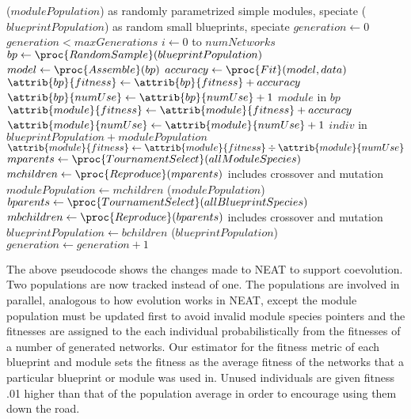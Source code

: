 \documentclass[11pt]{article}
\begin{document}
\begin{codebox}
\li {}($modulePopulation$) \>\>\>\>\>\>\>\>\Comment as randomly parametrized simple modules, speciate
\li {}($blueprintPopulation$) \>\>\>\>\>\>\>\>\Comment as random small blueprints, speciate
\li $generation \gets 0$
\li \While $generation < maxGenerations$
    \Do
\li    \For $i \gets 0$ to $numNetworks$
       \Do
\li	  		$bp \gets \proc{Random Sample}(blueprintPopulation)$
\li    		$model \gets \proc{Assemble} (bp)$
\li         $accuracy \gets \proc{Fit}(model, data)$
\li         $ \attrib{bp}{fitness} \gets \attrib{bp}{fitness} + accuracy$
\li         $ \attrib{bp}{numUse} \gets \attrib{bp}{numUse} + 1$
\li         \For $module$ in $bp$
			\Do
\li         	$ \attrib{module}{fitness} \gets \attrib{module}{fitness} + accuracy$
\li             $ \attrib{module}{numUse} \gets \attrib{module}{numUse} + 1$
			\End
	   \End
\li    \For $indiv$ in $blueprintPopulation + modulePopulation$
		\Do
\li         $ \attrib{module}{fitness} \gets \attrib{module}{fitness} \div \attrib{module}{numUse}$
		\End
\li    $mparents \gets \proc{Tournament Select}(allModuleSpecies)$
\li    $mchildren \gets \proc{Reproduce}(mparents)$ \>\>\>\>\>\>\>\>\Comment includes crossover and mutation
\li    $modulePopulation \gets mchildren$
\li    {}($modulePopulation$)
\li    $bparents \gets \proc{Tournament Select}(allBlueprintSpecies)$
\li    $mbchildren \gets \proc{Reproduce}(bparents)$ \>\>\>\>\>\>\>\>\Comment includes crossover and mutation
\li    $blueprintPopulation \gets bchildren$
\li    {}($blueprintPopulation$)
\li    $generation \gets generation + 1$
    \End
\End
\end{codebox}
The above pseudocode shows the changes made to NEAT to support coevolution. Two populations are now tracked instead of one. The populations are involved in parallel, analogous to how evolution works in NEAT, except the module population must be updated first to avoid invalid module species pointers and the fitnesses are assigned to the each individual probabilistically from the fitnesses of a number of generated networks. Our estimator for the fitness metric of each blueprint and module sets the fitness as the average fitness of the networks that a particular blueprint or module was used in. Unused individuals are given fitness .01 higher than that of the population average in order to encourage using them down the road.
\end{document}
